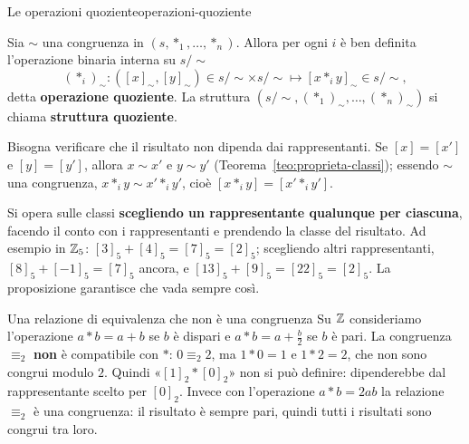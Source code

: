 \begin{concetto}
\begin{Proposizione}{Le operazioni quoziente}{operazioni-quoziente}
    \begin{prerequisiti}
    \end{prerequisiti}
    Sia $\sim$ una congruenza in $(s, *_1, \dots, *_n)$. Allora per ogni $i$ è ben definita l'operazione binaria interna su $s/{\sim}$
    \[ (*_i)_\sim \colon ([x]_\sim, [y]_\sim) \in s/{\sim} \times s/{\sim} \mapsto [x *_i y]_\sim \in s/{\sim}, \]
    detta \textbf{operazione quoziente}. La struttura $(s/{\sim}, (*_1)_\sim, \dots, (*_n)_\sim)$ si chiama \textbf{struttura quoziente}.
\end{Proposizione}
\begin{dimostrazione}
    Bisogna verificare che il risultato non dipenda dai rappresentanti. Se $[x] = [x']$ e $[y] = [y']$, allora $x \sim x'$ e $y \sim y'$
    (Teorema~\ref{teo:proprieta-classi}); essendo $\sim$ una congruenza, $x *_i y \sim x' *_i y'$, cioè $[x *_i y] = [x' *_i y']$.
\end{dimostrazione}
\end{concetto}

\begin{spiegazione}
    Si opera sulle classi \textbf{scegliendo un rappresentante qualunque per ciascuna}, facendo il conto con i rappresentanti e
    prendendo la classe del risultato. Ad esempio in $\mathbb{Z}_5$: $[3]_5 + [4]_5 = [7]_5 = [2]_5$; scegliendo altri rappresentanti,
    $[8]_5 + [-1]_5 = [7]_5$ ancora, e $[13]_5 + [9]_5 = [22]_5 = [2]_5$. La proposizione garantisce che vada sempre così.
\end{spiegazione}

\begin{esempio}{Una relazione di equivalenza che non è una congruenza}
    Su $\mathbb{Z}$ consideriamo l'operazione $a * b = a + b$ se $b$ è dispari e $a * b = a + \frac{b}{2}$ se $b$ è pari. La congruenza $\equiv_2$
    \textbf{non} è compatibile con $*$: $0 \equiv_2 2$, ma $1 * 0 = 1$ e $1 * 2 = 2$, che non sono congrui modulo $2$. Quindi «$[1]_2 * [0]_2$» non si può
    definire: dipenderebbe dal rappresentante scelto per $[0]_2$. Invece con l'operazione $a * b = 2ab$ la relazione $\equiv_2$ è una congruenza:
    il risultato è sempre pari, quindi tutti i risultati sono congrui tra loro.
\end{esempio}

